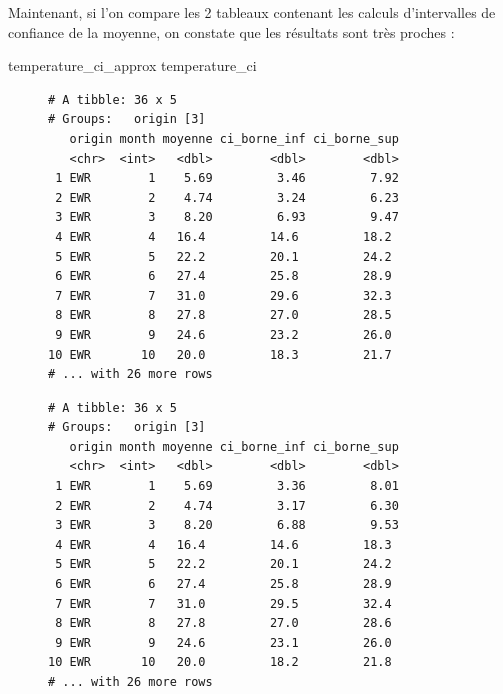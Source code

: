 \documentclass[
  a4paper,
  DIV=11,
  numbers=noendperiod,
  oneside]{scrreprt}
\newenvironment{Shaded}{}{}
\newcommand{\NormalTok}[1]{\textcolor[rgb]{0.14,0.16,0.18}{#1}}
\begin{document}
Maintenant, si l'on compare les 2 tableaux contenant les calculs
d'intervalles de confiance de la moyenne, on constate que les résultats
sont très proches :

\begin{Shaded}
\begin{Highlighting}[]
\NormalTok{temperature\_ci\_approx}
\NormalTok{temperature\_ci}
\end{Highlighting}
\end{Shaded}

\begin{figure}

\begin{minipage}[t]{0.50\linewidth}

{\centering 

\begin{verbatim}
# A tibble: 36 x 5
# Groups:   origin [3]
   origin month moyenne ci_borne_inf ci_borne_sup
   <chr>  <int>   <dbl>        <dbl>        <dbl>
 1 EWR        1    5.69         3.46         7.92
 2 EWR        2    4.74         3.24         6.23
 3 EWR        3    8.20         6.93         9.47
 4 EWR        4   16.4         14.6         18.2 
 5 EWR        5   22.2         20.1         24.2 
 6 EWR        6   27.4         25.8         28.9 
 7 EWR        7   31.0         29.6         32.3 
 8 EWR        8   27.8         27.0         28.5 
 9 EWR        9   24.6         23.2         26.0 
10 EWR       10   20.0         18.3         21.7 
# ... with 26 more rows
\end{verbatim}

}

\end{minipage}%
%
\begin{minipage}[t]{0.50\linewidth}

{\centering 

\begin{verbatim}
# A tibble: 36 x 5
# Groups:   origin [3]
   origin month moyenne ci_borne_inf ci_borne_sup
   <chr>  <int>   <dbl>        <dbl>        <dbl>
 1 EWR        1    5.69         3.36         8.01
 2 EWR        2    4.74         3.17         6.30
 3 EWR        3    8.20         6.88         9.53
 4 EWR        4   16.4         14.6         18.3 
 5 EWR        5   22.2         20.1         24.2 
 6 EWR        6   27.4         25.8         28.9 
 7 EWR        7   31.0         29.5         32.4 
 8 EWR        8   27.8         27.0         28.6 
 9 EWR        9   24.6         23.1         26.0 
10 EWR       10   20.0         18.2         21.8 
# ... with 26 more rows
\end{verbatim}

}

\end{minipage}%

\end{figure}
\end{document}
